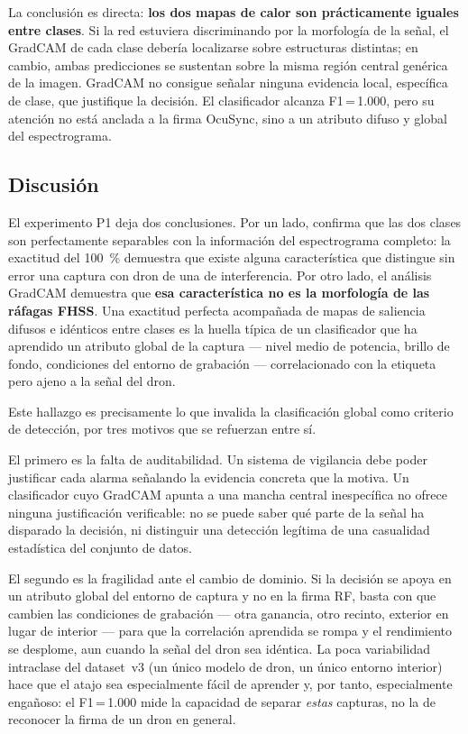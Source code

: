 La conclusión es directa: \textbf{los dos mapas de calor son prácticamente iguales entre clases}. Si la red estuviera discriminando por la morfología de la señal, el GradCAM de cada clase debería localizarse sobre estructuras distintas; en cambio, ambas predicciones se sustentan sobre la misma región central genérica de la imagen. GradCAM no consigue señalar ninguna evidencia local, específica de clase, que justifique la decisión. El clasificador alcanza F1\,=\,\num{1,000}, pero su atención no está anclada a la firma OcuSync, sino a un atributo difuso y global del espectrograma.

\subsection{Discusión}
\label{sec:p1_discusion}

El experimento P1 deja dos conclusiones. Por un lado, confirma que las dos clases son perfectamente separables con la información del espectrograma completo: la exactitud del \SI{100}{\percent} demuestra que existe alguna característica que distingue sin error una captura con dron de una de interferencia. Por otro lado, el análisis GradCAM demuestra que \textbf{esa característica no es la morfología de las ráfagas FHSS}. Una exactitud perfecta acompañada de mapas de saliencia difusos e idénticos entre clases es la huella típica de un clasificador que ha aprendido un atributo global de la captura --- nivel medio de potencia, brillo de fondo, condiciones del entorno de grabación --- correlacionado con la etiqueta pero ajeno a la señal del dron.


Este hallazgo es precisamente lo que invalida la clasificación global como criterio de detección, por tres motivos que se refuerzan entre sí.

El primero es la falta de auditabilidad. Un sistema de vigilancia debe poder justificar cada alarma señalando la evidencia concreta que la motiva. Un clasificador cuyo GradCAM apunta a una mancha central inespecífica no ofrece ninguna justificación verificable: no se puede saber qué parte de la señal ha disparado la decisión, ni distinguir una detección legítima de una casualidad estadística del conjunto de datos.


El segundo es la fragilidad ante el cambio de dominio. Si la decisión se apoya en un atributo global del entorno de captura y no en la firma RF, basta con que cambien las condiciones de grabación --- otra ganancia, otro recinto, exterior en lugar de interior --- para que la correlación aprendida se rompa y el rendimiento se desplome, aun cuando la señal del dron sea idéntica. La poca variabilidad intraclase del dataset~v3 (un único modelo de dron, un único entorno interior) hace que el atajo sea especialmente fácil de aprender y, por tanto, especialmente engañoso: el F1\,=\,\num{1,000} mide la capacidad de separar \emph{estas} capturas, no la de reconocer la firma de un dron en general.


